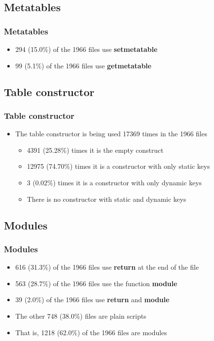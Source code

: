 \documentclass{beamer}
\begin{document}
\subsection{Metatables}
\begin{frame}
\frametitle{Metatables}
\begin{itemize}
\item 294 (15.0\%) of the 1966 files use \textbf{setmetatable}
\item 99 (5.1\%) of the 1966 files use \textbf{getmetatable}
\end{itemize}
\end{frame}

\subsection{Table constructor}
\begin{frame}
\frametitle{Table constructor}
\begin{itemize}
\item The table constructor is being used 17369 times in the 1966 files
\begin{itemize}
\item 4391 (25.28\%) times it is the empty construct
\item 12975 (74.70\%) times it is a constructor with only static keys
\item 3 (0.02\%) times it is a constructor with only dynamic keys
\item There is no constructor with static and dynamic keys
\end{itemize}
\end{itemize}
\end{frame}

\subsection{Modules}
\begin{frame}
\frametitle{Modules}
\begin{itemize}
\item 616 (31.3\%) of the 1966 files use \textbf{return} at the end of the file
\item 563 (28.7\%) of the 1966 files use the function \textbf{module}
\item 39 (2.0\%) of the 1966 files use \textbf{return} and \textbf{module}
\item The other 748 (38.0\%) files are plain scripts
\item That is, 1218 (62.0\%) of the 1966 files are modules
\end{itemize}
\end{frame}
\end{document}
